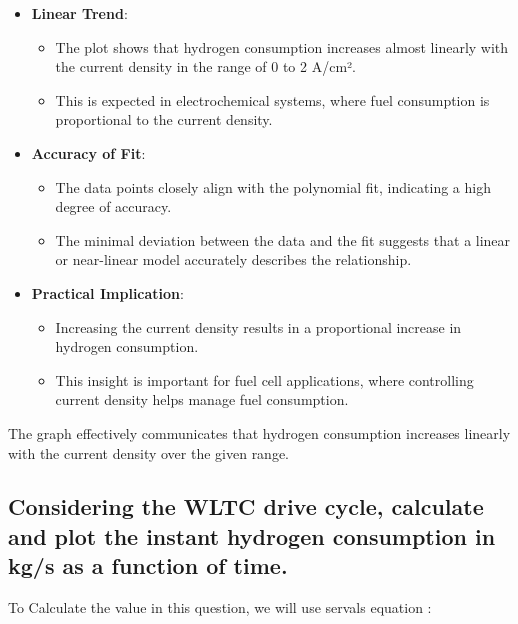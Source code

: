 \documentclass[12pt,a4paper]{article}
\numberwithin{equation}{section}
\begin{document}
{\begin{itemize}
	\item \textbf{Linear Trend}:
	\begin{itemize}
		\item The plot shows that hydrogen consumption increases almost linearly with the current density in the range of 0 to 2 A/cm².
		\item This is expected in electrochemical systems, where fuel consumption is proportional to the current density.
	\end{itemize}
	
	\item \textbf{Accuracy of Fit}:
	\begin{itemize}
		\item The data points closely align with the polynomial fit, indicating a high degree of accuracy.
		\item The minimal deviation between the data and the fit suggests that a linear or near-linear model accurately describes the relationship.
	\end{itemize}
	
	\item \textbf{Practical Implication}:
	\begin{itemize}
		\item Increasing the current density results in a proportional increase in hydrogen consumption.
		\item This insight is important for fuel cell applications, where controlling current density helps manage fuel consumption.
	\end{itemize}
	
\end{itemize}

The graph effectively communicates that hydrogen consumption increases linearly with the current density over the given range.




\subsection{Considering the WLTC drive cycle, calculate and plot the instant hydrogen consumption in kg/s
as a function of time.
}

To Calculate the value in this question, we will use servals equation :

}
\end{document}

